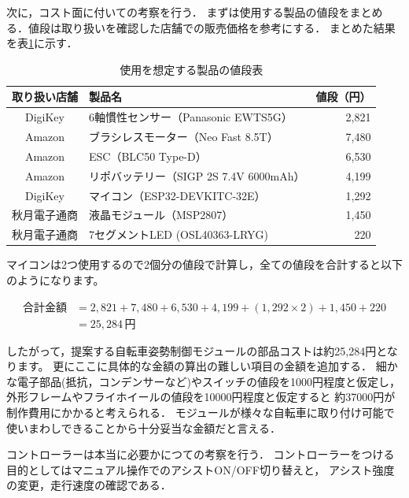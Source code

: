 \documentclass[uplatex,dvipdfmx]{jsarticle}
\begin{document}
次に，コスト面に付いての考察を行う．
まずは使用する製品の値段をまとめる．値段は取り扱いを確認した店舗での販売価格を参考にする．
まとめた結果を表\ref{table:Price}に示す．

\begin{table}[h]
  \centering
  \caption{使用を想定する製品の値段表}
  \label{table:Price}
  \begin{tabular}{clr}
\hline
取り扱い店舗 & 製品名 & 値段（円） \\\hline \hline
DigiKey & 6軸慣性センサー（Panasonic EWTS5G） & 2,821 \\\hline
Amazon & ブラシレスモーター（Neo Fast 8.5T） & 7,480 \\\hline
Amazon & ESC（BLC50 Type-D） & 6,530  \\\hline
Amazon & リポバッテリー（SIGP 2S 7.4V 6000mAh） & 4,199 \\\hline
DigiKey & マイコン（ESP32-DEVKITC-32E） & 1,292 \\\hline
秋月電子通商 & 液晶モジュール（MSP2807） & 1,450 \\\hline
秋月電子通商 & 7セグメントLED (OSL40363-LRYG) & 220 \\\hline
  \end{tabular}
\end{table}

マイコンは2つ使用するので2個分の値段で計算し，全ての値段を合計すると以下のようになります。

\begin{align*}
\text{合計金額} &= 2,821 + 7,480 + 6,530 + 4,199 + (1,292 \times 2) + 1,450 + 220 \\
&= 25,284 \, \text{円}
\end{align*}

したがって，提案する自転車姿勢制御モジュールの部品コストは約25,284円となります。
更にここに具体的な金額の算出の難しい項目の金額を追加する．
細かな電子部品(抵抗，コンデンサーなど)やスイッチの値段を1000円程度と仮定し，
外形フレームやフライホイールの値段を10000円程度と仮定すると
約37000円が制作費用にかかると考えられる．
モジュールが様々な自転車に取り付け可能で使いまわしできることから十分妥当な金額だと言える．


コントローラーは本当に必要かにつての考察を行う．
コントローラーをつける目的としてはマニュアル操作でのアシストON/OFF切り替えと，
アシスト強度の変更，走行速度の確認である．
\end{document}
